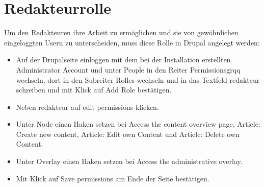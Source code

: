 \documentclass{swp}
\begin{document}
\section{Redakteurrolle}
Um den Redakteuren ihre Arbeit zu erm\"oglichen und sie von gew\"ohnlichen eingeloggten Usern zu unterscheiden, muss diese Rolle in Drupal angelegt werden:\\
\begin{itemize}
\item Auf der Drupalseite einloggen mit dem bei der Installation erstellten Administrator Account und unter \glqq People\grqq{} in den Reiter \glqq Permissionsgrqq{} wechseln, dort in den Subreiter \glqq Rolles\grqq{} wechseln und in das Textfeld \glqq redakteur\grqq{} schreiben und mit Klick auf \glqq Add Role\grqq{} best\"atigen.
\item Neben \glqq redakteur\grqq{} auf \glqq edit permissions\grqq{} klicken.
\item Unter \glqq Node\grqq{} einen Haken setzen bei \glqq Access the content overview page\grqq{}, \glqq Article: Create new content\grqq{}, \glqq Article: Edit own Content\grqq{} und \glqq Article: Delete own Content\grqq{}.
\item Unter  \glqq Overlay\grqq{} einen Haken setzen bei \glqq Access the administrative overlay\grqq{}.
\item Mit Klick auf \glqq Save permissions\grqq{} am Ende der Seite best\"atigen.
\end{itemize}
\end{document}
